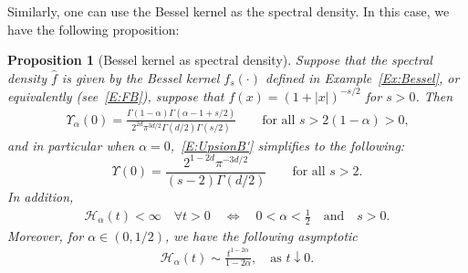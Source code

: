 \documentclass[a4paper,11pt]{article}%
\theoremstyle{plain}
\newtheorem{proposition}[theorem]{Proposition}
\theoremstyle{definition}
\numberwithin{equation}{section}
\begin{document}
Similarly, one can use the Bessel kernel as the spectral density. In this case, we have the
following proposition:

\begin{proposition}[Bessel kernel as spectral density]\label{P:Bessel'}
  Suppose that the spectral density $\widehat{f}$ is given by the Bessel kernel $f_s(\cdot)$ defined
  in Example~\ref{Ex:Bessel}, or equivalently (see~\eqref{E:FB}), suppose that $f(x) =
  (1+|x|)^{-s/2}$ for $s>0$. Then
  \begin{align}\label{E:UpsionB'}
    \Upsilon_{\alpha}(0)
    = \frac{\Gamma\left(1 - \alpha\right) \Gamma\left(\alpha - 1 + s/2\right)}{2^{2d} \pi^{3d/2} \Gamma(d/2)\Gamma\left(s/2\right) }
    \qquad \text{for all $s>2(1-\alpha)>0$,}
  \end{align}
   and in particular when $\alpha = 0$,~\eqref{E:UpsionB'} simplifies to the following:
  \begin{equation}\label{E:Upsilon_0'}
     \Upsilon(0) = \frac{2^{1-2 d}\pi^{-3d/2}}{(s-2)\Gamma\left(d/2\right)}
     \qquad \text{for all $s>2$.}
  \end{equation}
  In addition,
  \begin{gather}\label{E:HaB'}
    \mathcal{H}_\alpha(t) <\infty \quad \forall t>0 \quad \Longleftrightarrow \quad
    0<\alpha<\frac{1}{2} \quad \text{and} \quad s>0.
  \end{gather}
 Moreover, for $\alpha\in(0,1/2)$, we have the following asymptotic
  \begin{align}\label{E:HaBS'}
    \mathcal{H}_\alpha(t) \sim \frac{t^{1-2\alpha}}{1-2\alpha}, \quad \text{as $t\downarrow 0.$}
  \end{align}
\end{proposition}
\end{document}
